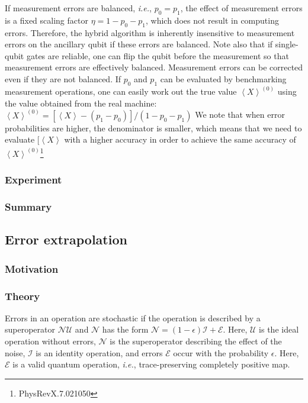 \documentclass[11pt, oneside]{article}   	%
\begin{document}
If measurement errors are balanced, \textit{i.e.}, $p_0 = p_1$, the effect of measurement errors is a fixed scaling factor 
$\eta = 1 - p_0 - p_1$, which does not result in computing errors. 
Therefore, the hybrid algorithm is inherently insensitive to measurement errors on the ancillary qubit if these errors are balanced. 
Note also that if single-qubit gates are reliable, one can flip the qubit before the measurement so that measurement errors are effectively balanced.
Measurement errors can be corrected even if they are not balanced. 
If $p_0$ and $p_1$ can be evaluated by benchmarking measurement operations, one can easily work out the true value 
$\left< X \right>^{(0)}$ using the value obtained from the real machine: 
$\left< X \right>^{(0)} = [\left< X \right> - (p_1 - p_0)]/(1 - p_0 - p_1)$
We note that when error probabilities are higher, the denominator is smaller, which means that we need to evaluate $[\left< X \right>$ with a higher accuracy in order to achieve the same accuracy of $\left< X \right>^{(0)}$\footnote{PhysRevX.7.021050}

\subsubsection{Experiment}
\subsubsection{Summary}

\subsection{Error extrapolation}
\subsubsection{Motivation}
\subsubsection{Theory}
Errors in an operation are stochastic if the operation is described by a superoperator $\mathcal{N} \mathcal{U}$ and $\mathcal{N}$ has the form 
$\mathcal{N} = (1 - \epsilon) \mathcal{I} + \mathcal{E}$. 
Here, $\mathcal{U}$ is the ideal operation without errors, $\mathcal{N}$ is the superoperator describing the effect of the noise, $\mathcal{I}$ is an identity operation, and errors $\mathcal{E}$ occur with the probability $\epsilon$. 
Here, $\mathcal{E}$ is a valid quantum operation, \textit{i.e.}, trace-preserving completely positive map.
\end{document}
